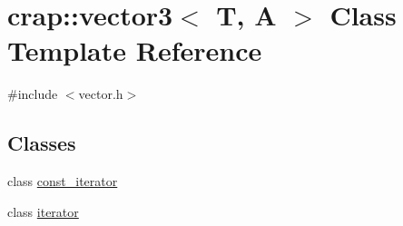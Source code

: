 \hypertarget{classcrap_1_1vector3}{\section{crap\+:\+:vector3$<$ T, A $>$ Class Template Reference}
\label{classcrap_1_1vector3}
}


{\ttfamily \#include $<$vector.\+h$>$}

\subsection*{Classes}
\begin{DoxyCompactItemize}
\item 
class \hyperlink{classcrap_1_1vector3_1_1const__iterator}{const\+\_\+iterator}
\item 
class \hyperlink{classcrap_1_1vector3_1_1iterator}{iterator}
\end{DoxyCompactItemize}
